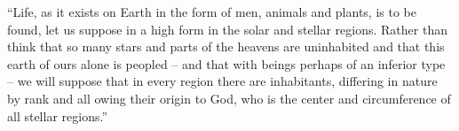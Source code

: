 \begin{footnotesize}
\begin{sffamily}
``Life, as it exists on Earth in the form of men, animals and plants, is to be found, let us suppose in a high form in the solar and stellar regions. Rather than think that so many stars and parts of the heavens are uninhabited and that this earth of ours alone is peopled -- and that with beings perhaps of an inferior type -- we will suppose that in every region there are inhabitants, differing in nature by rank and all owing their origin to God, who is the center and circumference of all stellar regions.''


\hfill

\end{sffamily}
\end{footnotesize}

